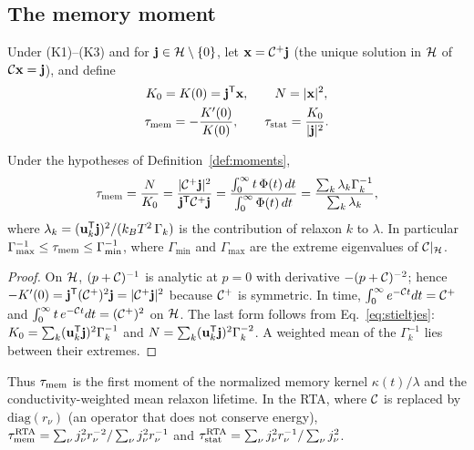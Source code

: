 \subsection{The memory moment}\label{sec:memory}

\begin{definition}[Moments]\label{def:moments}
Under (K1)--(K3) and for $\mathbf j\in\mathcal H\setminus\{0\}$, let $\mathbf x=\mathcal C^+\mathbf j$ (the unique solution in $\mathcal H$
of $\mathcal C\mathbf x=\mathbf j$), and define
\begin{equation}
\begin{gathered}
K_0=K(0)=\mathbf j^{\mathsf T}\mathbf x,\qquad N=|\mathbf x|^2,\\
\tau_{\rm mem}=-\frac{K'(0)}{K(0)},\qquad \tau_{\rm stat}=\frac{K_0}{|\mathbf j|^2}.
\end{gathered}
\label{eq:moments}
\end{equation}
\end{definition}

\begin{lemma}\label{lem:forms}
Under the hypotheses of Definition~\ref{def:moments},
\begin{equation}
\tau_{\rm mem}=\frac{N}{K_0}=\frac{|\mathcal C^+\mathbf j|^2}{\mathbf j^{\mathsf T}\mathcal C^+\mathbf j}
=\frac{\int_0^\infty t\,\Phi(t)\,dt}{\int_0^\infty\Phi(t)\,dt}
=\frac{\sum_k\lambda_k\Gamma_k^{-1}}{\sum_k\lambda_k},
\label{eq:forms}
\end{equation}
where $\lambda_k=(\mathbf u_k^{\mathsf T}\mathbf j)^2/(k_BT^2\,\Gamma_k)$ is the contribution of relaxon $k$ to
$\lambda$. In particular $\Gamma_{\max}^{-1}\le\tau_{\rm mem}\le\Gamma_{\min}^{-1}$, where $\Gamma_{\min}$ and
$\Gamma_{\max}$ are the extreme eigenvalues of $\mathcal C|_{\mathcal H}$.
\end{lemma}

\begin{proof}
On $\mathcal H$, $(p+\mathcal C)^{-1}$ is analytic at $p=0$ with derivative $-(p+\mathcal C)^{-2}$; hence
$-K'(0)=\mathbf j^{\mathsf T}(\mathcal C^+)^2\mathbf j=|\mathcal C^+\mathbf j|^2$ because $\mathcal C^+$ is symmetric. In time,
$\int_0^\infty e^{-\mathcal C t}dt=\mathcal C^{+}$ and $\int_0^\infty t\,e^{-\mathcal C t}dt=(\mathcal C^{+})^2$ on $\mathcal H$. The
last form follows from Eq.~\eqref{eq:stieltjes}: $K_0=\sum_k(\mathbf u_k^{\mathsf T}\mathbf j)^2\Gamma_k^{-1}$ and
$N=\sum_k(\mathbf u_k^{\mathsf T}\mathbf j)^2\Gamma_k^{-2}$. A weighted mean of the $\Gamma_k^{-1}$ lies between their
extremes.
\end{proof}

Thus $\tau_{\rm mem}$ is the first moment of the normalized memory kernel $\kappa(t)/\lambda$ and the
conductivity-weighted mean relaxon lifetime. In the RTA, where $\mathcal C$ is replaced by
$\mathrm{diag}(r_\nu)$ (an operator that does not conserve energy),
$\tau_{\rm mem}^{\rm RTA}=\sum_\nu j_\nu^2r_\nu^{-2}/\sum_\nu j_\nu^2r_\nu^{-1}$ and
$\tau_{\rm stat}^{\rm RTA}=\sum_\nu j_\nu^2r_\nu^{-1}/\sum_\nu j_\nu^2$.

